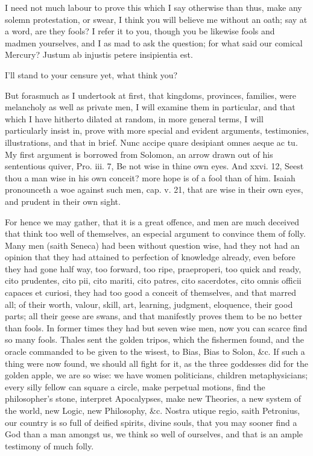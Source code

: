 {I need not much labour to prove this which I say otherwise than thus,
make any solemn protestation, or swear, I think you will believe me
without an oath; say at a word, are they fools? I refer it to you,
though you be likewise fools and madmen yourselves, and I as mad to ask
the question; for what said our comical Mercury?
Justum ab injustis petere insipientia est.

I'll stand to your censure yet, what think you?

But forasmuch as I undertook at first, that kingdoms, provinces,
families, were melancholy as well as private men, I will examine them
in particular, and that which I have hitherto dilated at random, in
more general terms, I will particularly insist in, prove with more
special and evident arguments, testimonies, illustrations, and that in
brief. Nunc accipe quare desipiant omnes aeque ac tu. My first
argument is borrowed from Solomon, an arrow drawn out of his
sententious quiver, Pro. iii. 7, Be not wise in thine own eyes. And
xxvi. 12, Seest thou a man wise in his own conceit? more hope is of a
fool than of him. Isaiah pronounceth a woe against such men, cap. v.
21, that are wise in their own eyes, and prudent in their own sight.

For hence we may gather, that it is a great offence, and men are much
deceived that think too well of themselves, an especial argument to
convince them of folly. Many men (saith Seneca) had been without
question wise, had they not had an opinion that they had attained to
perfection of knowledge already, even before they had gone half way,
too forward, too ripe, praeproperi, too quick and ready, cito
prudentes, cito pii, cito mariti, cito patres, cito sacerdotes, cito
omnis officii capaces et curiosi, they had too good a conceit of
themselves, and that marred all; of their worth, valour, skill, art,
learning, judgment, eloquence, their good parts; all their geese are
swans, and that manifestly proves them to be no better than fools. In
former times they had but seven wise men, now you can scarce find so
many fools. Thales sent the golden tripos, which the fishermen found,
and the oracle commanded to be  given to the wisest, to Bias, Bias
to Solon, \&c. If such a thing were now found, we should all fight for
it, as the three goddesses did for the golden apple, we are so wise: we
have women politicians, children metaphysicians; every silly fellow can
square a circle, make perpetual motions, find the philosopher's stone,
interpret Apocalypses, make new Theories, a new system of the world,
new Logic, new Philosophy, \&c. Nostra utique regio, saith
Petronius, our country is so full of deified spirits, divine
souls, that you may sooner find a God than a man amongst us, we think
so well of ourselves, and that is an ample testimony of much folly.

}
